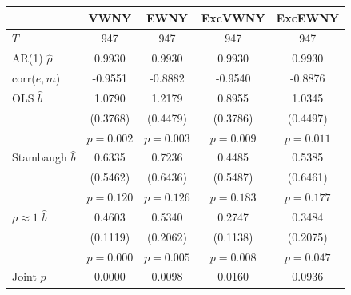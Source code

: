\begin{tabular}{lcccc}
\toprule
 & VWNY & EWNY & ExcVWNY & ExcEWNY \\
\midrule
$T$ & 947 & 947 & 947 & 947 \\
AR(1) $\hat\rho$ & 0.9930 & 0.9930 & 0.9930 & 0.9930 \\
corr($e,m$) & -0.9551 & -0.8882 & -0.9540 & -0.8876 \\
\midrule
OLS $\hat b$ & 1.0790 & 1.2179 & 0.8955 & 1.0345 \\
 & (0.3768) & (0.4479) & (0.3786) & (0.4497) \\
 & $p=0.002$ & $p=0.003$ & $p=0.009$ & $p=0.011$ \\
Stambaugh $\hat b$ & 0.6335 & 0.7236 & 0.4485 & 0.5385 \\
 & (0.5462) & (0.6436) & (0.5487) & (0.6461) \\
 & $p=0.120$ & $p=0.126$ & $p=0.183$ & $p=0.177$ \\
$\rho\approx1$ $\hat b$ & 0.4603 & 0.5340 & 0.2747 & 0.3484 \\
 & (0.1119) & (0.2062) & (0.1138) & (0.2075) \\
 & $p=0.000$ & $p=0.005$ & $p=0.008$ & $p=0.047$ \\
\midrule
Joint $p$ & 0.0000 & 0.0098 & 0.0160 & 0.0936 \\
\bottomrule
\end{tabular}
